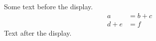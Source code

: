 \documentclass[12pt]{article}
\begin{document}
Some text before the display.
\begin{align*} a &= b + c \\ d + e &= f \end{align*}
Text after the display.
\end{document}
